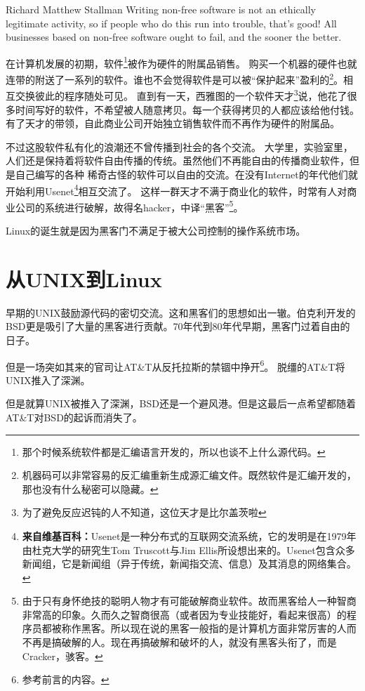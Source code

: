 
\begin{quotes}{Richard Matthew Stallman}
Writing non-free software is not an ethically legitimate activity, so if people who do this run into trouble, that's good! All businesses based on non-free software ought to fail, and the sooner the better.
\end{quotes}

在计算机发展的初期，软件\footnote{那个时候系统软件都是汇编语言开发的，所以也谈不上什么源代码。}被作为硬件的附属品销售。
购买一个机器的硬件也就连带的附送了一系列的软件。谁也不会觉得软件是可以被“保护起来”盈利的\footnote{机器码可以非常容易的反汇编重新生成源汇编文件。既然软件是汇编开发的，那也没有什么秘密可以隐藏。}。相互交换彼此的程序随处可见。
直到有一天，西雅图的一个软件天才\footnote{为了避免反应迟钝的人不知道，这位天才是比尔\textbullet{}盖茨啦}说，他花了很多时间写好的软件，不希望被人随意拷贝。每一个获得拷贝的人都应该给他付钱。
有了天才的带领，自此商业公司开始独立销售软件而不再作为硬件的附属品。

不过这股软件私有化的浪潮还不曾传播到社会的各个交流。
大学里，实验室里，人们还是保持着将软件自由传播的传统。虽然他们不再能自由的传播商业软件，但是自己编写的各种
稀奇古怪的软件可以自由的交流。在没有Internet的年代他们就开始利用Usenet\footnote{%
\textbf{来自维基百科：}Usenet是一种分布式的互联网交流系统，它的发明是在1979年由杜克大学的研究生Tom Truscott与Jim Ellis所设想出来的。Usenet包含众多新闻组，它是新闻组（异于传统，新闻指交流、信息）及其消息的网络集合。 }相互交流了。
%
这样一群天才不满于商业化的软件，时常有人对商业公司的系统进行破解，故得名hacker，中译“黑客”\footnote{%
由于只有身怀绝技的聪明人物才有可能破解商业软件。故而黑客给人一种智商非常高的印象。久而久之智商很高（或者因为专业技能好，看起来很高）的程序员都被称作黑客。所以现在说的黑客一般指的是计算机方面非常厉害的人而不再是搞破解的人。现在再搞破解和破坏的人，就没有黑客头衔了，而是Cracker，骇客。
}。

Linux的诞生就是因为黑客门不满足于被大公司控制的操作系统市场。

\section{从UNIX到Linux}

早期的UNIX鼓励源代码的密切交流。这和黑客们的思想如出一辙。伯克利开发的BSD更是吸引了大量的黑客进行贡献。70年代到80年代早期，黑客门过着自由的日子。


但是一场突如其来的官司让AT\&T从反托拉斯的禁锢中挣开\footnote{参考前言的内容。}。
脱缰的AT\&T将UNIX推入了深渊。

但是就算UNIX被推入了深渊，BSD还是一个避风港。但是这最后一点希望都随着AT\&T对BSD的起诉而消失了。


